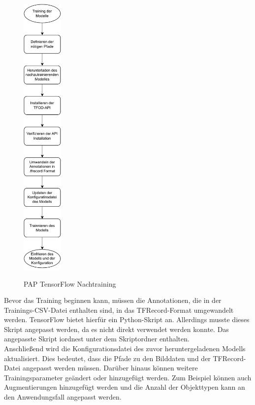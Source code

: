 \begin{figure}
    \centering
    \includegraphics[width=0.18\textwidth]{images/pap_train_tensorflow.pdf}
    \label{fig:tens-pap}
    \caption{\acs*{PAP} TensorFlow Nachtraining}
\end{figure}

Bevor das Training beginnen kann, müssen die Annotationen, die in der Trainings-CSV-Datei enthalten sind, in das TFRecord-Format umgewandelt werden. TensorFlow bietet hierfür ein Python-Skript an. Allerdings musste dieses Skript angepasst werden, da es nicht direkt verwendet werden konnte. Das angepasste Skript iordnest unter dem Skriptordner enthalten.\\
Anschließend wird die Konfigurationsdatei des zuvor heruntergeladenen Modells aktualisiert. Dies bedeutet, dass die Pfade zu den Bilddaten und der TFRecord-Datei angepasst werden müssen. Darüber hinaus können weitere Trainingsparameter geändert oder hinzugefügt werden. Zum Beispiel können auch Augmentierungen hinzugefügt werden und die Anzahl der Objekttypen kann an den Anwendungsfall angepasst werden.

